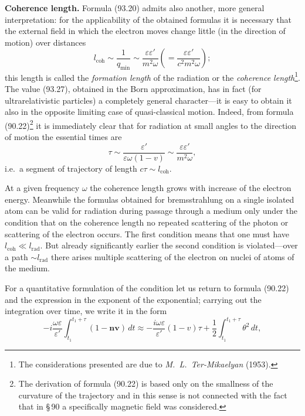 \textbf{Coherence length.} Formula (93.20) admits also another, more general interpretation: for the applicability of the obtained formulas it is necessary that the external field in which the electron moves change little (in the direction of motion) over distances
\begin{equation}
l_\text{coh} \sim \frac{1}{q_\text{min}} \sim \frac{\varepsilon\varepsilon'}{m^2\omega} \left(= \frac{\varepsilon\varepsilon'}{c^2m^2\omega}\right);
\label{eq:93.27}
\end{equation}
this length is called the \emph{formation length} of the radiation or the \emph{coherence length}\footnote{The considerations presented are due to \emph{M.~L.~Ter-Mikaelyan} (1953).}. The value (93.27), obtained in the Born approximation, has in fact (for ultrarelativistic particles) a completely general character---it is easy to obtain it also in the opposite limiting case of quasi-classical motion. Indeed, from formula (90.22)\footnote{The derivation of formula (90.22) is based only on the smallness of the curvature of the trajectory and in this sense is not connected with the fact that in \S\,90 a specifically magnetic field was considered.} it is immediately clear that for radiation at small angles to the direction of motion the essential times are
\[
\tau \sim \frac{\varepsilon'}{\varepsilon\omega(1 - v)} \sim \frac{\varepsilon\varepsilon'}{m^2\omega},
\]
i.e.\ a segment of trajectory of length $c\tau \sim l_\text{coh}$.

At a given frequency $\omega$ the coherence length grows with increase of the electron energy. Meanwhile the formulas obtained for bremsstrahlung on a single isolated atom can be valid for radiation during passage through a medium only under the condition that on the coherence length no repeated scattering of the photon or scattering of the electron occurs. The first condition means that one must have $l_\text{coh} \ll l_\text{rad}$. But already significantly earlier the second condition is violated---over a path $\sim l_\text{rad}$ there arises multiple scattering of the electron on nuclei of atoms of the medium.

For a quantitative formulation of the condition let us return to formula (90.22) and the expression in the exponent of the exponential; carrying out the integration over time, we write it in the form
\begin{equation}
-i\frac{\omega\varepsilon}{\varepsilon'}\int_{t_1}^{t_1+\tau}\!(1 - \mathbf{n}\mathbf{v})\,dt \approx -\frac{i\omega\varepsilon}{\varepsilon'}(1 - v)\tau + \frac{1}{2}\int_{t_1}^{t_1+\tau}\!\theta^2\,dt,
\label{eq:93.28}
\end{equation}

